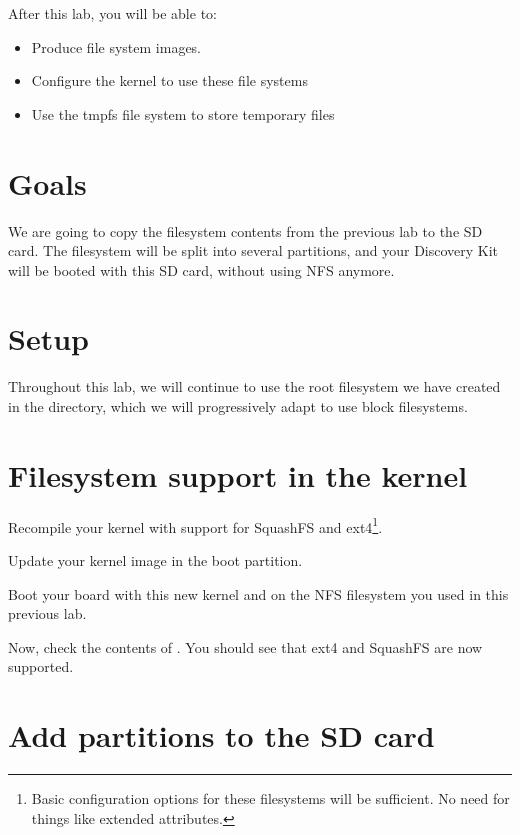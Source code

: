 
After this lab, you will be able to:
\begin{itemize}
\item Produce file system images.
\item Configure the kernel to use these file systems
\item Use the tmpfs file system to store temporary files
\end{itemize}

\section{Goals}

We are going to copy the filesystem contents from the previous lab
to the SD card. The filesystem will be split into several partitions,
and your Discovery Kit will be booted with this SD card, without using
NFS anymore.

\section{Setup}

Throughout this lab, we will continue to use the root filesystem we
have created in the 
directory, which we will progressively adapt to use block filesystems.

\section{Filesystem support in the kernel}

Recompile your kernel with support for SquashFS and ext4\footnote{Basic
configuration options for these filesystems will be sufficient. No need
for things like extended attributes.}.

Update your kernel image in the boot partition.

Boot your board with this new kernel and on the NFS filesystem you
used in this previous lab.

Now, check the contents of . You should see
 that ext4 and SquashFS are now supported.

\section{Add partitions to the SD card}

